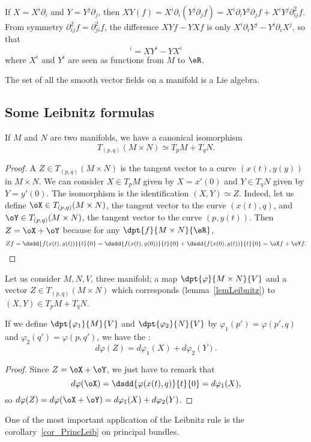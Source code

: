 If $X=X^i\partial_i$ and $Y=Y^j\partial_j$, then
$XY(f)=X^i\partial_i(Y^j\partial_jf)
     =X^i\partial_i Y^j\partial_j f+X^iY^j\partial^2_{ij}f$.
From symmetry $\partial^2_{ij}f=\partial^2_{ji}f$, the difference $XYf-YXf$ is only $X^i\partial_iY^j-Y^i\partial_iX^j$, so that
\begin{equation}
  [X,Y]^i=XY^i-YX^i
\end{equation}
where $X^i$ and $Y^i$ are seen as functions from $M$ to $\eR$.

\begin{proposition}       \label{PROPooSWQSooSEfTuX}
    The set of all the smooth vector fields on a manifold is a Lie algebra.
\end{proposition}

\subsection{Some Leibnitz formulas}

\begin{lemma}
If $M$ and $N$ are two manifolds, we have a canonical isomorphism
\[
     T_{(p,q)}(M\times N)\simeq T_pM+T_qN.
\]
\label{lemLeibnitz}
\end{lemma}

\begin{proof}
A $Z\in T_{(p,q)}(M\times N)$ is the tangent vector to a curve $(x(t),y(y))$ in $M\times N$. We can consider $X\in T_pM$ given by $X=x'(0)$ and $Y\in T_qN$ given by $Y=y'(0)$. The isomorphism is the identification $(X,Y)\simeq Z$. Indeed, let us define $\oX\in T_{(p,q)}(M\times N)$, the tangent vector to the curve $(x(t),q)$, and $\oY\in T_{(p,q)}(M\times N)$, the tangent vector to the curve $(p,y(t))$. Then $Z=\oX+\oY$ because for any $\dpt{f}{M\times N}{\eR}$,
\begin{equation}
 Zf=\dsdd{f(x(t),y(t))}{t}{0}
   =\dsdd{f(x(t),y(0))}{t}{0}+\dsdd{f(x(0),y(t))}{t}{0}
   =\oX f+\oY f.
\end{equation}
\end{proof}

\begin{proposition} \label{Leibnitz}
Let us consider $M,N,V$, three manifold; a map $\dpt{\varphi}{M\times N}{V}$ and a vector $Z\in T_{(p,q)}(M\times N)$ which corresponds (lemma~\ref{lemLeibnitz}) to $(X,Y)\in T_pM+T_qN$.

If we define $\dpt{\varphi_1}{M}{V}$ and  $\dpt{\varphi_2}{N}{V}$ by $\varphi_1(p')=\varphi(p',q)$ and $\varphi_2(q')=\varphi(p,q')$, we have the :
\begin{equation}
    d\varphi(Z)=d\varphi_1(X)+d\varphi_2(Y).
\end{equation}
\end{proposition}
\begin{proof}
 Since $Z=\oX+\oY$, we just have to remark that
\[
                  d\varphi(\oX)=\dsdd{\varphi(x(t),q)}{t}{0}=d\varphi_1(X),
\]
so $d\varphi(Z)=d\varphi(\oX+\oY)=d\varphi_1(X)+d\varphi_2(Y)$.
\end{proof}
One of the most important application of the Leibnitz rule is the corollary~\ref{cor_PrincLeib} on principal bundles.

